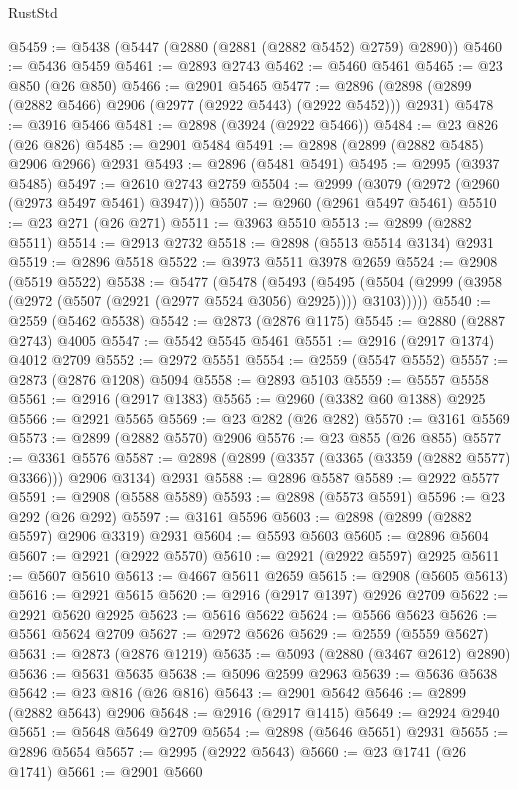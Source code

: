 \begin{lexlean}{RustStd}
\begin{coremodule}
@5459 := @5438 (@5447 (@2880 (@2881 (@2882 @5452) @2759) @2890))
@5460 := @5436 @5459
@5461 := @2893 @2743
@5462 := @5460 @5461
@5465 := @23 @850 (@26 @850)
@5466 := @2901 @5465
@5477 := @2896 (@2898 (@2899 (@2882 @5466) @2906 (@2977 (@2922 @5443) (@2922 @5452))) @2931)
@5478 := @3916 @5466
@5481 := @2898 (@3924 (@2922 @5466))
@5484 := @23 @826 (@26 @826)
@5485 := @2901 @5484
@5491 := @2898 (@2899 (@2882 @5485) @2906 @2966) @2931
@5493 := @2896 (@5481 @5491)
@5495 := @2995 (@3937 @5485)
@5497 := @2610 @2743 @2759
@5504 := @2999 (@3079 (@2972 (@2960 (@2973 @5497 @5461) @3947)))
@5507 := @2960 (@2961 @5497 @5461)
@5510 := @23 @271 (@26 @271)
@5511 := @3963 @5510
@5513 := @2899 (@2882 @5511)
@5514 := @2913 @2732
@5518 := @2898 (@5513 @5514 @3134) @2931
@5519 := @2896 @5518
@5522 := @3973 @5511 @3978 @2659
@5524 := @2908 (@5519 @5522)
@5538 := @5477
    (@5478
      (@5493
        (@5495 (@5504 (@2999 (@3958 (@2972 (@5507 (@2921 (@2977 @5524 @3056) @2925)))) @3103)))))
@5540 := @2559 (@5462 @5538)
@5542 := @2873 (@2876 @1175)
@5545 := @2880 (@2887 @2743) @4005
@5547 := @5542 @5545 @5461
@5551 := @2916 (@2917 @1374) @4012 @2709
@5552 := @2972 @5551
@5554 := @2559 (@5547 @5552)
@5557 := @2873 (@2876 @1208) @5094
@5558 := @2893 @5103
@5559 := @5557 @5558
@5561 := @2916 (@2917 @1383)
@5565 := @2960 (@3382 @60 @1388) @2925
@5566 := @2921 @5565
@5569 := @23 @282 (@26 @282)
@5570 := @3161 @5569
@5573 := @2899 (@2882 @5570) @2906
@5576 := @23 @855 (@26 @855)
@5577 := @3361 @5576
@5587 := @2898 (@2899 (@3357 (@3365 (@3359 (@2882 @5577) @3366))) @2906 @3134) @2931
@5588 := @2896 @5587
@5589 := @2922 @5577
@5591 := @2908 (@5588 @5589)
@5593 := @2898 (@5573 @5591)
@5596 := @23 @292 (@26 @292)
@5597 := @3161 @5596
@5603 := @2898 (@2899 (@2882 @5597) @2906 @3319) @2931
@5604 := @5593 @5603
@5605 := @2896 @5604
@5607 := @2921 (@2922 @5570)
@5610 := @2921 (@2922 @5597) @2925
@5611 := @5607 @5610
@5613 := @4667 @5611 @2659
@5615 := @2908 (@5605 @5613)
@5616 := @2921 @5615
@5620 := @2916 (@2917 @1397) @2926 @2709
@5622 := @2921 @5620 @2925
@5623 := @5616 @5622
@5624 := @5566 @5623
@5626 := @5561 @5624 @2709
@5627 := @2972 @5626
@5629 := @2559 (@5559 @5627)
@5631 := @2873 (@2876 @1219)
@5635 := @5093 (@2880 (@3467 @2612) @2890)
@5636 := @5631 @5635
@5638 := @5096 @2599 @2963
@5639 := @5636 @5638
@5642 := @23 @816 (@26 @816)
@5643 := @2901 @5642
@5646 := @2899 (@2882 @5643) @2906
@5648 := @2916 (@2917 @1415)
@5649 := @2924 @2940
@5651 := @5648 @5649 @2709
@5654 := @2898 (@5646 @5651) @2931
@5655 := @2896 @5654
@5657 := @2995 (@2922 @5643)
@5660 := @23 @1741 (@26 @1741)
@5661 := @2901 @5660

\end{coremodule}
\end{lexlean}
